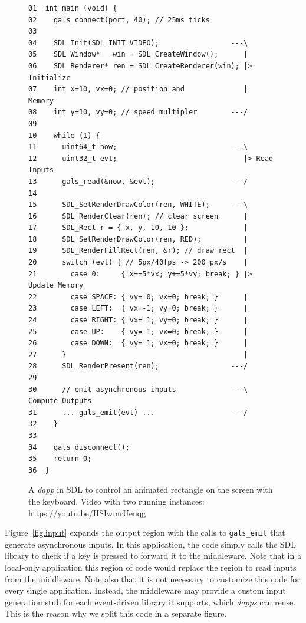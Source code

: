 \documentclass[sigplan,screen]{acmart}
\newcommand{\dapp}{\emph{dapp}\xspace}
\newcommand{\dapps}{\emph{dapps}\xspace}
\begin{document}
\begin{figure}[t]
{\scriptsize
\begin{verbatim}
01  int main (void) {
02    gals_connect(port, 40); // 25ms ticks
03
04    SDL_Init(SDL_INIT_VIDEO);                 ---\
05    SDL_Window*   win = SDL_CreateWindow();      |
06    SDL_Renderer* ren = SDL_CreateRenderer(win); |> Initialize
07    int x=10, vx=0; // position and              |    Memory
08    int y=10, vy=0; // speed multipler        ---/
09
10    while (1) {
11      uint64_t now;                           ---\
12      uint32_t evt;                              |> Read Inputs
13      gals_read(&now, &evt);                  ---/
14
15      SDL_SetRenderDrawColor(ren, WHITE);     ---\
16      SDL_RenderClear(ren); // clear screen      |
17      SDL_Rect r = { x, y, 10, 10 };             |
18      SDL_SetRenderDrawColor(ren, RED);          |
19      SDL_RenderFillRect(ren, &r); // draw rect  |
20      switch (evt) { // 5px/40fps -> 200 px/s    |
21        case 0:     { x+=5*vx; y+=5*vy; break; } |> Update Memory
22        case SPACE: { vy= 0; vx=0; break; }      |
23        case LEFT:  { vx=-1; vy=0; break; }      |
24        case RIGHT: { vx= 1; vy=0; break; }      |
25        case UP:    { vy=-1; vx=0; break; }      |
26        case DOWN:  { vy= 1; vx=0; break; }      |
27      }                                          |
28      SDL_RenderPresent(ren);                 ---/
29
30      // emit asynchronous inputs             ---\  Compute Outputs
31      ... gals_emit(evt) ...                  ---/
32    }
33
34    gals_disconnect();
35    return 0;
36  }
\end{verbatim}
}
  \caption{
    \label{fig.sdl}
    A \dapp in SDL to control an animated rectangle on the screen with the keyboard.
    Video with two running instances: \url{https://youtu.be/HSIwmrUenqg}
  }
\end{figure}

Figure~\ref{fig.input} expands the output region with the calls to
\texttt{gals\_emit} that generate asynchronous inputs.
In this application, the code simply calls the SDL library to check if a key is
pressed to forward it to the middleware.
Note that in a local-only application this region of code would replace the
region to read inputs from the middleware.
Note also that it is not necessary to customize this code for every single
application.
Instead, the middleware may provide a custom input generation stub for each
event-driven library it supports, which \dapps can reuse.
This is the reason why we split this code in a separate figure.
\end{document}
